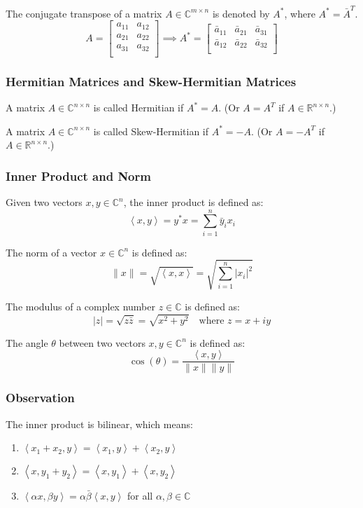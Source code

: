 \documentclass[11pt]{article}
\newcommand{\inner}[2]{\left\langle #1, #2 \right\rangle}
\begin{document}
The conjugate transpose of a matrix $A \in \mathbb{C}^{m \times n}$ is denoted by $A^*$, where $A^* = \bar{A}^T$.
\[A = \begin{bmatrix}
    a_{11} & a_{12} \\
    a_{21} & a_{22} \\
    a_{31} & a_{32} \\
\end{bmatrix} \implies A^* = \begin{bmatrix}
    \bar{a}_{11} & \bar{a}_{21} & \bar{a}_{31} \\
    \bar{a}_{12} & \bar{a}_{22} & \bar{a}_{32} \\
\end{bmatrix}\]

\subsubsection{Hermitian Matrices and Skew-Hermitian Matrices}
A matrix $A \in \mathbb{C}^{n \times n}$ is called Hermitian if $A^* = A$. (Or $A = A^T$ if $A \in \mathbb{R}^{n \times n}$.)

A matrix $A \in \mathbb{C}^{n \times n}$ is called Skew-Hermitian if $A^* = -A$. (Or $A = -A^T$ if $A \in \mathbb{R}^{n \times n}$.)

\subsubsection{Inner Product and Norm}
Given two vectors $x, y \in \mathbb{C}^n$, the inner product is defined as:
\[\inner{x}{y} = y^* x = \sum_{i=1}^{n} \bar{y}_i x_i\]

The norm of a vector $x \in \mathbb{C}^n$ is defined as:
\[\|x\| = \sqrt{\inner{x}{x}} = \sqrt{\sum_{i=1}^{n} |x_i|^2}\]

The modulus of a complex number $z \in \mathbb{C}$ is defined as:
\[|z| = \sqrt{z \bar{z}} = \sqrt{x^2 + y^2} \quad \text{where } z = x + iy\]

The angle $\theta$ between two vectors $x, y \in \mathbb{C}^n$ is defined as:
\[\cos(\theta) = \frac{\inner{x}{y}}{\|x\| \|y\|}\]

\subsubsection*{Observation}
The inner product is bilinear, which means:
\begin{enumerate}
    \item $\inner{x_1 + x_2}{y} = \inner{x_1}{y} + \inner{x_2}{y}$
    \item $\inner{x}{y_1 + y_2} = \inner{x}{y_1} + \inner{x}{y_2}$
    \item $\inner{\alpha x}{\beta y} = \alpha \bar{\beta} \inner{x}{y}$ for all $\alpha, \beta \in \mathbb{C}$
\end{enumerate}
\end{document}
